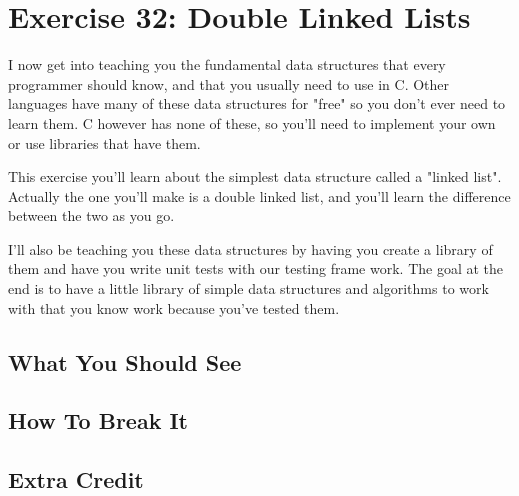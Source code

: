 \chapter{Exercise 32: Double Linked Lists}

I now get into teaching you the fundamental data structures that every programmer should
know, and that you usually need to use in C.  Other languages have many of these data structures
for "free" so you don't ever need to learn them.  C however has none of these, so you'll
need to implement your own or use libraries that have them.

This exercise you'll learn about the simplest data structure called a "linked list".  Actually
the one you'll make is a double linked list, and you'll learn the difference between the two
as you go.

I'll also be teaching you these data structures by having you create a library of them and 
have you write unit tests with our testing frame work.  The goal at the end is to have a 
little library of simple data structures and algorithms to work with that you know work 
because you've tested them.


\section{What You Should See}


\section{How To Break It}


\section{Extra Credit}



